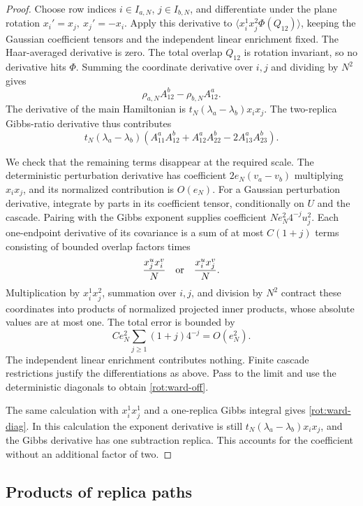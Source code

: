 \begin{proof}
Choose row indices \(i\in I_{a,N}\), \(j\in I_{b,N}\), and
differentiate under the plane rotation
\(x_i'=x_j,\ x_j'=-x_i\).
Apply this derivative to
\(\langle x_i^1x_j^2\Phi(Q_{12})\rangle\), keeping the Gaussian
coefficient tensors and the independent linear enrichment fixed.
The Haar-averaged derivative is zero.  The total overlap \(Q_{12}\)
is rotation invariant, so no derivative hits \(\Phi\).
Summing the coordinate derivative over \(i,j\) and dividing by \(N^2\)
gives
\[
 \rho_{a,N}A^b_{12}-\rho_{b,N}A^a_{12}.
\]
The derivative of the main Hamiltonian is
\(t_N(\lambda_a-\lambda_b)x_i x_j\).
The two-replica Gibbs-ratio derivative thus contributes
\[
 t_N(\lambda_a-\lambda_b)
  \left(A^a_{11}A^b_{12}
        +A^a_{12}A^b_{22}-2A^a_{13}A^b_{23}\right).
\]

We check that the remaining terms disappear at the required scale.
The deterministic perturbation derivative has coefficient
\(2e_N(v_a-v_b)\) multiplying \(x_i x_j\), and its normalized
contribution is \(O(e_N)\).
For a Gaussian perturbation derivative, integrate by parts in its
coefficient tensor, conditionally on \(U\) and the cascade.
Pairing with the Gibbs exponent supplies coefficient
\(Ne_N^2 4^{-j}u_j^2\).
Each one-endpoint derivative of its covariance is a sum of at most
\(C(1+j)\) terms consisting of bounded overlap factors times
\[
 \frac{x_j^u x_i^v}{N}
       \quad\hbox{or}\quad \frac{x_i^u x_j^v}{N}.
\]
Multiplication by \(x_i^1x_j^2\), summation over \(i,j\), and
division by \(N^2\) contract these coordinates into products of
normalized projected inner products, whose absolute values are at
most one.  The total error is bounded by
\[
 Ce_N^2\sum_{j\ge1}(1+j)4^{-j}=O(e_N^2).
\]
The independent linear enrichment contributes nothing.
Finite cascade restrictions justify the differentiations as above.
Pass to the limit and use the deterministic diagonals to obtain
\eqref{rot:ward-off}.

The same calculation with \(x_i^1x_j^1\) and a one-replica Gibbs
integral gives
\eqref{rot:ward-diag}.  In this calculation the exponent derivative
is still \(t_N(\lambda_a-\lambda_b)x_i x_j\), and the Gibbs derivative
has one subtraction replica.  This accounts for the coefficient
without an additional factor of two.
\end{proof}

\subsection{Products of replica paths}

